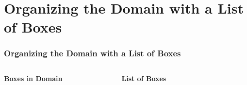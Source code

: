 \section{Organizing the Domain with a List of Boxes}
\begin{frame}
    \frametitle{Organizing the Domain with a List of Boxes}

    \begin{columns}[c]
    \textbf{Boxes in Domain}
    \begin{figure}[h]
        \centering
        \resizebox{.9\textwidth}{!}{%
            
        }
    \end{figure}

    \textbf{List of Boxes}
    \begin{figure}[h]
        \centering
        \resizebox{.9\textwidth}{!}{%
            
        }
    \end{figure}
    \end{columns}

\end{frame}



